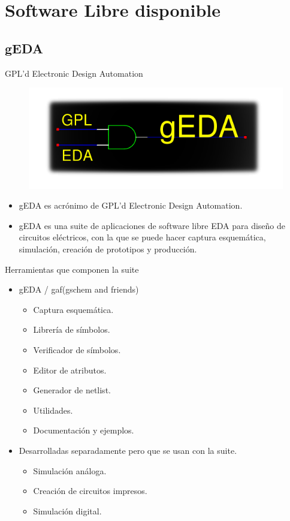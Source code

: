 \documentclass{beamer}
\begin{document}
\section{Software Libre disponible}

\subsection[gEDA - \url{http://www.gpleda.org}]{gEDA}

\begin{frame}{GPL'd Electronic Design Automation}
  \begin{figure}[!h]
    \centering
    \includegraphics[scale=0.4]{img/geda.png}
  \end{figure}
  \begin{itemize}
  \item gEDA es acrónimo de GPL'd Electronic Design Automation.
  \item gEDA es una suite de aplicaciones de software libre EDA para diseño de circuitos eléctricos, con la que se puede hacer captura esquemática, simulación, creación de prototipos y producción.
  \end{itemize}
\end{frame}

\begin{frame}{Herramientas que componen la suite}
  \begin{itemize}
  \item gEDA / gaf(gschem and friends)
      \begin{itemize}
      \item Captura esquemática.
      \item Librería de símbolos.
      \item Verificador de símbolos.
      \item Editor de atributos.
      \item Generador de netlist.
      \item Utilidades.
      \item Documentación y ejemplos.
      \end{itemize}
    \item Desarrolladas separadamente pero que se usan con la suite.
      \begin{itemize}
      \item Simulación análoga.
      \item Creación de circuitos impresos.
      \item Simulación digital.
      \end{itemize}
  \end{itemize}
\end{frame}
\end{document}
